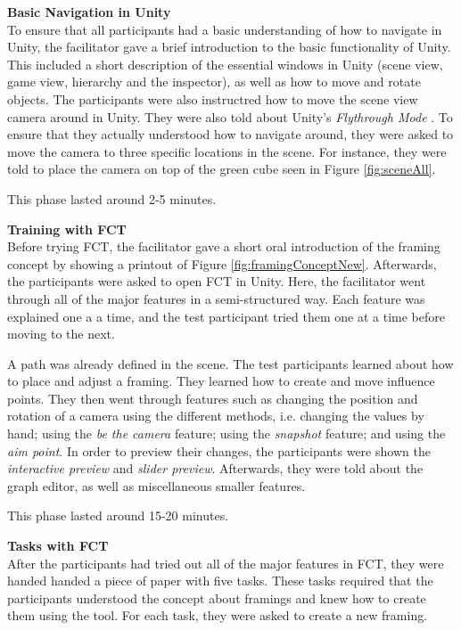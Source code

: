 \textbf{Basic Navigation in Unity}\\
To ensure that all participants had a basic understanding of how to navigate in Unity, the facilitator gave a brief introduction to the basic functionality of Unity. This included a short description of the essential windows in Unity (scene view, game view, hierarchy and the inspector), as well as how to move and rotate objects. The participants were also instructred how to move the scene view camera around in Unity. They were also told about Unity's \textit{Flythrough Mode} \cite{unity_flyMode}. To ensure that they actually understood how to navigate around, they were asked to move the camera to three specific locations in the scene. For instance, they were told to place the camera on top of the green cube seen in Figure \ref{fig:sceneAll}.

This phase lasted around 2-5 minutes.

\textbf{Training with FCT}\\
Before trying FCT, the facilitator gave a short oral introduction of the framing concept by showing a printout of Figure \ref{fig:framingConceptNew}. Afterwards, the participants were asked to open FCT in Unity. Here, the facilitator went through all of the major features in a semi-structured way. Each feature was explained one a a time, and the test participant tried them one at a time before moving to the next.

A path was already defined in the scene. The test participants learned about how to place and adjust a framing. They learned how to create and move influence points. They then went through features such as changing the position and rotation of a camera using the different methods, i.e. changing the values by hand; using the \textit{be the camera} feature; using the \textit{snapshot} feature; and using the \textit{aim point}. In order to preview their changes, the participants were shown the \textit{interactive preview} and \textit{slider preview}. Afterwards, they were told about the graph editor, as well as miscellaneous smaller features.

This phase lasted around 15-20 minutes.

\textbf{Tasks with FCT}\\
After the participants had tried out all of the major features in FCT, they were handed handed a piece of paper with five tasks. These tasks required that the participants understood the concept about framings and knew how to create them using the tool. For each task, they were asked to create a new framing.

